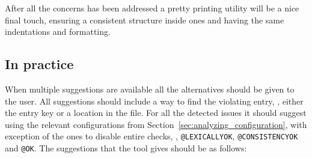 After all the concerns has been addressed a pretty printing utility
will be a nice final touch, ensuring a consistent structure inside ones
 and having the same indentations and formatting.

\subsection{In practice}
\label{sec:organizing_practice}

When multiple suggestions are available all the alternatives should be
given to the user.  All suggestions should include a way to find the
violating entry, \ie, either the entry key or a location in the file.
For all the detected issues it should suggest using the relevant
configurations from Section~\ref{sec:analyzing_configuration}, with
exception of the ones to disable entire checks, \ie,
\texttt{@LEXICALLYOK}, \texttt{@CONSISTENCYOK} and \texttt{@OK}.  The
suggestions that the tool gives should be as follows:


